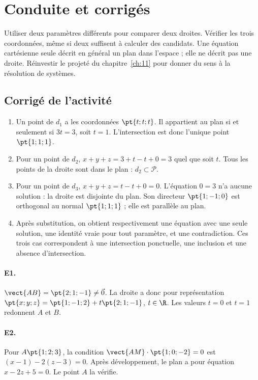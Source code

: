 \ifmxteacher\mxnewpage\section{Conduite et corrigés}\begin{teachernote}Utiliser deux paramètres différents pour comparer deux droites. Vérifier les trois coordonnées, même si deux suffisent à calculer des candidats. Une équation cartésienne seule décrit en général un plan dans l'espace ; elle ne décrit pas une droite. Réinvestir le projeté du chapitre~\ref{ch:11} pour donner du sens à la résolution de systèmes.\end{teachernote}

\subsection{Corrigé de l'activité}\begin{enumerate}
\item Un point de $d_1$ a les coordonnées $\pt{t;t;t}$. Il appartient au plan si et seulement si $3t=3$, soit $t=1$. L'intersection est donc l'unique point $\pt{1;1;1}$.
\item Pour un point de $d_2$, $x+y+z=3+t-t+0=3$ quel que soit $t$. Tous les points de la droite sont dans le plan : $d_2\subset\mathcal P$.
\item Pour un point de $d_3$, $x+y+z=t-t+0=0$. L'équation $0=3$ n'a aucune solution : la droite est disjointe du plan. Son directeur $\pt{1;-1;0}$ est orthogonal au normal $\pt{1;1;1}$ ; elle est parallèle au plan.
\item Après substitution, on obtient respectivement une équation avec une seule solution, une identité vraie pour tout paramètre, et une contradiction. Ces trois cas correspondent à une intersection ponctuelle, une inclusion et une absence d'intersection.
\end{enumerate}

\paragraph{E1.}$\vect{AB}=\pt{2;1;-1}\ne\vec0$. La droite a donc pour représentation $\pt{x;y;z}=\pt{1;-1;2}+t\pt{2;1;-1}$, $t\in\R$. Les valeurs $t=0$ et $t=1$ redonnent $A$ et $B$.

\paragraph{E2.}Pour $A\pt{1;2;3}$, la condition $\vect{AM}\cdot\pt{1;0;-2}=0$ est $(x-1)-2(z-3)=0$. Après développement, le plan a pour équation $x-2z+5=0$. Le point $A$ la vérifie.

